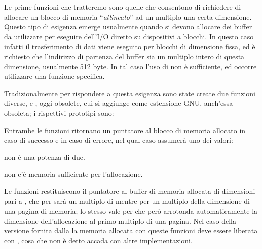 Le prime funzioni che tratteremo sono quelle che consentono di richiedere di
allocare un blocco di memoria ``\textsl{allineato}'' ad un multiplo una certa
dimensione. Questo tipo di esigenza emerge usualmente quando si devono
allocare dei buffer da utilizzare per eseguire dell'I/O diretto su dispositivi
a blocchi. In questo caso infatti il trasferimento di dati viene eseguito per
blocchi di dimensione fissa, ed è richiesto che l'indirizzo di partenza del
buffer sia un multiplo intero di questa dimensione, usualmente 512 byte. In
tal caso l'uso di  non è sufficiente, ed occorre utilizzare una
funzione specifica.

Tradizionalmente per rispondere a questa esigenza sono state create due
funzioni diverse,  e , oggi obsolete, cui si
aggiunge  come estensione GNU, anch'essa obsoleta; i rispettivi
prototipi sono:

\begin{funcproto}{ 
}
{Entrambe le funzioni ritornano un puntatore al blocco di memoria allocato in
  caso di successo e  in caso di errore, nel qual caso 
  assumerà uno dei valori:
  \begin{errlist}
  \item[\errcode{EINVAL}]  non è una potenza di due.
  \item[\errcode{ENOMEM}] non c'è memoria sufficiente per l'allocazione.
  \end{errlist}}
\end{funcproto}

Le funzioni restituiscono il puntatore al buffer di memoria allocata di
dimensioni pari a , che per  sarà un multiplo di
 mentre per  un multiplo della dimensione di una
pagina di memoria; lo stesso vale per  che però arrotonda
automaticamente la dimensione dell'allocazione al primo multiplo di una
pagina. Nel caso della versione fornita dalla  la memoria allocata
con queste funzioni deve essere liberata con , cosa che non è detto
accada con altre implementazioni.

